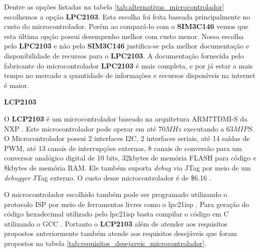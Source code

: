 Dentre as opções listadas na tabela \ref{tab:alternativas_microcontrolador} escolhemos a opção \textbf{LPC2103}. Esta escolha foi feita baseada principalmente no custo do microcontrolador. Porém ao compará-lo com o \textbf{SIM3C146} vemos que esta última opção possui desempenho melhor com custo menor. Nossa escolha pelo \textbf{LPC2103} e não pelo \textbf{SIM3C146} justifica-se pela melhor documentação e disponibilidade de recursos para o \textbf{LPC2103}. A documentação fornecida pelo fabricante do microcontrolador \textbf{LPC2103} é mais completa, e por já estar a mais tempo no mercado a quantidade de informações e recursos disponíveis na internet é maior.

\textbf{LCP2103}

O \textbf{LCP2103} é um microcontrolador baseado na arquitetura ARM7TDMI-S da NXP \cite{lpc2103}. Este microcontrolador pode operar em até $ 70MHz $ executando a $ 63MIPS $. O Microcontrolador possui 2 interfaces I2C, 2 interfaces seriais, até 14 saídas de PWM, até 13 canais de interrupções externas, 8 canais de conversão para um conversor analógico digital de 10 bits, 32kbytes de memória FLASH para código e 8kbytes de memória RAM. Ele também suporta \textit{debug} via JTag por meio de um \textit{debugger} JTag externo. O custo desse microcontrolador é de \$6.16 \cite{digikey}.

O microcontrolador escolhido também pode ser programado utilizando o protocolo ISP por meio de ferramentas livres como o lpc21isp \cite{lpc21isp}. Para geração do código hexadecimal utilizado pelo lpc21isp basta compilar o código em C utilizando o GCC \cite{gcc}.
Portanto o \textbf{LCP2103} além de atender aos requisitos propostos anteriormente também atende aos requisitos desejáveis que foram propostos na tabela \ref{tab:requisitos_desejaveis_microcontrolador}.
